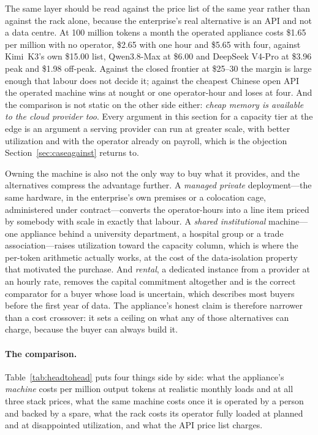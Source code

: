 The same layer should be read against the price list of the same year rather than against the rack alone, because the enterprise's real alternative is an API and not a data centre. At 100 million tokens a month the operated appliance costs \$1.65 per million with no operator, \$2.65 with one hour and \$5.65 with four, against Kimi~K3's own \$15.00 list, Qwen3.8-Max at \$6.00 and DeepSeek V4-Pro at \$3.96 peak and \$1.98 off-peak. Against the closed frontier at \$25--30 the margin is large enough that labour does not decide it; against the cheapest Chinese open API the operated machine wins at nought or one operator-hour and loses at four. And the comparison is not static on the other side either: \emph{cheap memory is available to the cloud provider too}. Every argument in this section for a capacity tier at the edge is an argument a serving provider can run at greater scale, with better utilization and with the operator already on payroll, which is the objection Section~\ref{sec:caseagainst} returns to.

Owning the machine is also not the only way to buy what it provides, and the alternatives compress the advantage further. A \emph{managed private} deployment---the same hardware, in the enterprise's own premises or a colocation cage, administered under contract---converts the operator-hours into a line item priced by somebody with scale in exactly that labour. A \emph{shared institutional} machine---one appliance behind a university department, a hospital group or a trade association---raises utilization toward the capacity column, which is where the per-token arithmetic actually works, at the cost of the data-isolation property that motivated the purchase. And \emph{rental}, a dedicated instance from a provider at an hourly rate, removes the capital commitment altogether and is the correct comparator for a buyer whose load is uncertain, which describes most buyers before the first year of data. The appliance's honest claim is therefore narrower than a cost crossover: it sets a ceiling on what any of those alternatives can charge, because the buyer can always build it.

\paragraph{The comparison.} Table~\ref{tab:headtohead} puts four things side by side: what the appliance's \emph{machine} costs per million output tokens at realistic monthly loads and at all three stack prices, what the same machine costs once it is operated by a person and backed by a spare, what the rack costs its operator fully loaded at planned and at disappointed utilization, and what the API price list charges.

